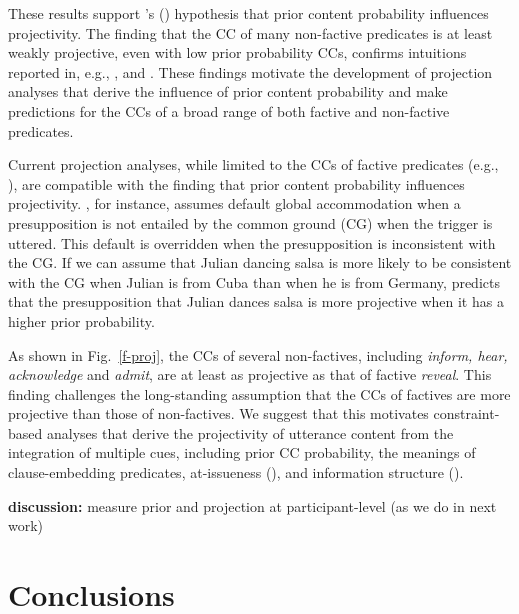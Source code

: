 \documentclass[11pt,fleqn]{article}
\newcommand{\6}{\mbox{$[\hspace*{-.6mm}[$}}
\newcommand{\9}{\mbox{$]\hspace*{-.6mm}]$}}
\newcommand{\citetpos}[1]{\citeauthor{#1}'s (\citeyear{#1})}
\begin{document}
These results support \citetpos{tbd-variability} hypothesis that prior content probability influences projectivity. The finding that the CC of many non-factive predicates is at least weakly projective, even with low prior probability CCs, confirms intuitions reported in, e.g., \citealt{schlenker10}, \citealt{anand-hacquard2014} and \citealt{spector-egre2015}. These findings motivate the development of projection analyses that derive the influence of prior content probability and make predictions for the CCs of a broad range of both factive and non-factive predicates.

Current projection analyses, while limited to the CCs of factive predicates (e.g., \citealt{heim83,vds92,abrusan2011,brst-salt10,brst-ar}), are compatible with the finding that prior content probability influences projectivity. \citealt{heim83}, for instance, assumes default global accommodation when a presupposition is not entailed by the common ground (CG) when the trigger is uttered. This default is overridden when the presupposition is inconsistent with the CG. If we can assume that Julian dancing salsa is more likely to be consistent with the CG when Julian is from Cuba than when he is from Germany, \citealt{heim83} predicts that the presupposition that Julian dances salsa is more projective when it has a higher prior probability. 

As shown in Fig.~\ref{f-proj}, the CCs of several non-factives, including {\em inform, hear, acknowledge} and {\em admit}, are at least as projective as that of factive {\em reveal}. This finding challenges the long-standing assumption that the CCs of factives are more projective than those of non-factives. We suggest that this motivates constraint-based analyses that derive the projectivity of utterance content from the integration of multiple cues, including prior CC probability, the meanings of clause-embedding predicates, at-issueness (\citealt{tbd-variability}), and information structure (\citealt{tonhauser-salt26}).

{\bf discussion:} measure prior and projection at participant-level (as we do in next work)

\section{Conclusions}\label{s5}





\end{document}

